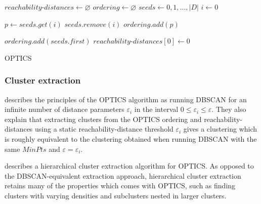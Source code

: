 \documentclass[a4paper]{report}
\begin{document}
{
    \fontsize{10}{12}
    \selectfont
    \begin{algorithm}[H]
        \DontPrintSemicolon
        \BlankLine
        \BlankLine

        $reachability$-$distances \gets \varnothing$\;
        $ordering \gets \varnothing$\;
        $seeds \gets 0,1,...,|D|$\;
        $i \gets 0$\;

         {
            $p \gets seeds.get(i)$\;
            $seeds.remove(i)$\;
            $ordering.add(p)$\;

        }
        \;
        $ordering.add(seeds.first)$\;
        $reachability$-$distances[0] \gets 0$\;
        \BlankLine
        \caption{OPTICS}
        \label{alg:optics}
    \end{algorithm}
}

\subsubsection{Cluster extraction}

\citeauthor{ankerst99} describes the principles of the OPTICS algorithm as
running DBSCAN for an infinite number of distance parameters $\varepsilon_i$
in the interval $0 \le \varepsilon_i \le \varepsilon$. They also explain that
extracting clusters from the OPTICS ordering and reachability-distances using
a static reachability-distance threshold $\varepsilon_i$ gives a clustering
which is roughly equivalent to the clustering obtained when running DBSCAN
with the same $MinPts$ and $\varepsilon = \varepsilon_i$.

\citet{sander03} describes a hierarchical cluster extraction algorithm for
OPTICS. As opposed to the DBSCAN-equivalent extraction approach, hierarchical
cluster extraction retains many of the properties which comes with OPTICS,
such as finding clusters with varying densities and subclusters nested in larger
clusters.
\end{document}
